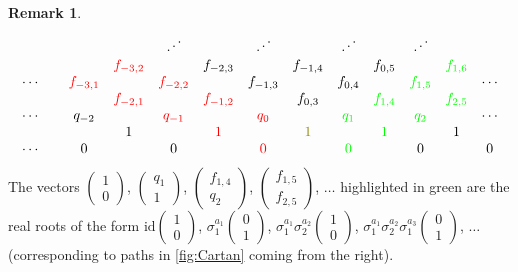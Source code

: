 \documentclass[11pt,a4paper]{amsart}
\theoremstyle{definition}
\newtheorem{Remark}[Lemma]{Remark}
\numberwithin{equation}{section}
\begin{document}
\begin{Remark}
$$\begin{array}{ccccccccccccc}
&& & & \iddots & & \iddots & & \iddots & & \iddots & & \\
&& & {\color{red} f_{-3,2}}& & f_{-2,3} & & f_{-1,4} & & f_{0,5} & & {\color{green} f_{1,6}} &  \\
 \cdots & & {\color{red}f_{-3,1}} &  & 
 {\color{red} f_{-2,2}} & & f_{-1,3} & & f_{0,4} & & {\color{green} f_{1,5}} & &  \cdots \\
&& & {\color{red} f_{-2,1}} & & {\color{red} f_{-1,2}} & & f_{0,3} & & 
{\color{green} f_{1,4}} & & {\color{green} f_{2,5}} &  \\
 \cdots & & q_{-2} & & {\color{red} q_{-1}} & & {\color{red} q_0} & & 
 {\color{green} q_1} & & {\color{green} q_2} & & \cdots \\
&&   & 1 & & {\color{red} 1} & & {\color{olive} 1} & & 
{\color{green} 1} & & 1 & \\
\cdots && 0 &  & 0 &  & {\color{red} 0} &  & {\color{green} 0} &  & 0 &  & 0  \\
 \end{array}
$$
The vectors $\begin{pmatrix} 1\\0 \end{pmatrix}$,
$\begin{pmatrix} q_1\\1 \end{pmatrix}$,
$\begin{pmatrix} f_{1,4}\\q_2 \end{pmatrix}$,
$\begin{pmatrix} f_{1,5}\\f_{2,5}\end{pmatrix}$,
$\ldots$ highlighted in green are the
real roots of the 
form $\mathrm{id}\begin{pmatrix} 1\\0
\end{pmatrix}$, $\sigma_1^{a_1}\begin{pmatrix} 0\\1
\end{pmatrix}$, $\sigma_1^{a_1}\sigma_2^{a_2} \begin{pmatrix} 1\\0\end{pmatrix}$,
$\sigma_1^{a_1}\sigma_2^{a_2}\sigma_1^{a_3} \begin{pmatrix} 0\\1\end{pmatrix}$, $\ldots$
(corresponding to paths in \ref{fig:Cartan}
coming from the right). 


\end{Remark}
\end{document}
